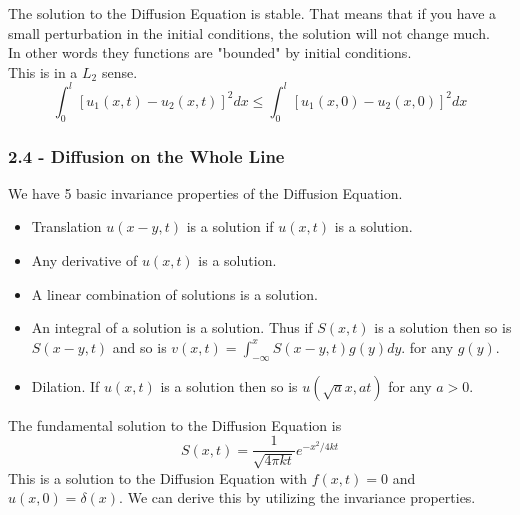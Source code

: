 \documentclass[answers,12pt,addpoints]{exam}
\begin{document}
\begin{definition}[Stablitity]
    The solution to the Diffusion Equation is stable. That means that if you have a small perturbation in the initial conditions, the solution will not change much.\\
    In other words they functions are "bounded" by initial conditions.\\
    This is in a $L_2$ sense.
    $$ \int_0^l [u_1(x,t) - u_2(x,t)]^2 dx \leq \int_0^l [u_1(x,0) - u_2(x,0)]^2 dx$$
\end{definition}
\subsubsection{2.4 - Diffusion on the Whole Line}
\begin{definition}
    We have 5 basic invariance properties of the Diffusion Equation.
    \begin{itemize}
        \item Translation $u(x - y, t)$ is a solution if $u(x,t)$ is a solution.
        \item Any derivative of $u(x,t)$ is a solution. 
        \item A linear combination of solutions is a solution.
        \item An integral of a solution is a solution. Thus if $S(x,t)$ is a solution then so is $S(x - y, t)$ and so is $v(x,t) = \int_{-\infty}^x S(x - y, t) g(y) dy$. for any $g(y)$.
        \item Dilation. If $u(x,t)$ is a solution then so is $u(\sqrt{a}x, at)$ for any $a > 0$.
    \end{itemize}
\end{definition}
\begin{definition}
    The fundamental solution to the Diffusion Equation is 
    $$ S(x,t) = \frac{1}{\sqrt{4\pi kt}} e^{-x^2/4kt}$$
    This is a solution to the Diffusion Equation with $f(x,t) = 0$ and $u(x,0) = \delta(x)$.
    We can derive this by utilizing the invariance properties.
\end{definition}
\end{document}
